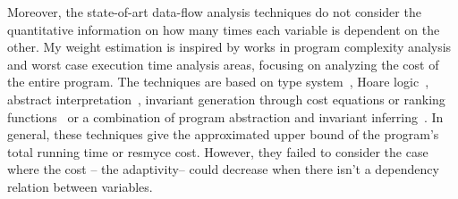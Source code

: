 %
%
%
Moreover, the state-of-art data-flow analysis techniques do not
consider the quantitative information on how many times each variable is dependent on the other. 
My weight estimation is inspired by
 works in program complexity analysis and worst case execution time analysis areas, 
 focusing on analyzing the cost of the entire program. 
The techniques are based on
type system~\cite{CicekBG0H17, RajaniG0021}, Hoare logic~\cite{CarbonneauxHS15}, abstract interpretation~\cite{GustafssonEL05, HumenbergerJK18},
invariant generation through cost equations or ranking functions~\cite{BrockschmidtEFFG16,AlbertAGP08,AliasDFG10,Flores-MontoyaH14}
or a combination of program abstraction and invariant inferring~\cite{GulwaniZ10, SinnZV17,GulwaniJK09}.
In general, these techniques give the approximated upper bound of the program's total running time or resmyce cost.
However, they failed to consider the case where the cost -- the adaptivity-- could decrease when there isn't a dependency relation between variables.
